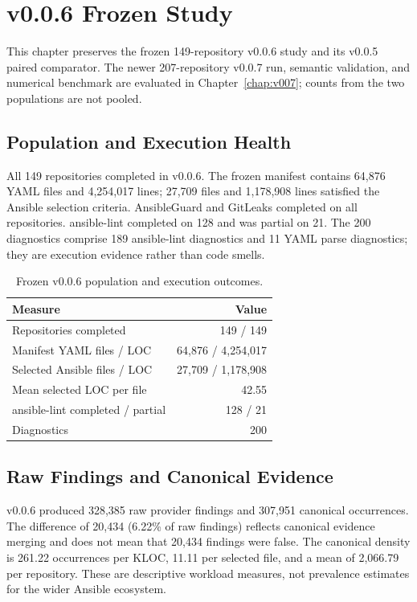\chapter{v0.0.6 Frozen Study}
\label{chap:results}

This chapter preserves the frozen 149-repository v0.0.6 study and its
v0.0.5 paired comparator. The newer 207-repository v0.0.7 run, semantic
validation, and numerical benchmark are evaluated in
Chapter~\ref{chap:v007}; counts from the two populations are not pooled.

\section{Population and Execution Health}
All 149 repositories completed in v0.0.6. The frozen manifest contains 64,876
YAML files and 4,254,017 lines; 27,709 files and 1,178,908 lines satisfied the
Ansible selection criteria. AnsibleGuard and GitLeaks completed on all
repositories. ansible-lint completed on 128 and was partial on 21. The 200
diagnostics comprise 189 ansible-lint diagnostics and 11 YAML parse
diagnostics; they are execution evidence rather than code smells.

\begin{table}[H]
\centering
\caption{Frozen v0.0.6 population and execution outcomes.}
\begin{tabular}{lr}
\toprule
Measure & Value \\
\midrule
Repositories completed & 149 / 149 \\
Manifest YAML files / LOC & 64,876 / 4,254,017 \\
Selected Ansible files / LOC & 27,709 / 1,178,908 \\
Mean selected LOC per file & 42.55 \\
ansible-lint completed / partial & 128 / 21 \\
Diagnostics & 200 \\
\bottomrule
\end{tabular}
\end{table}

\section{Raw Findings and Canonical Evidence}
v0.0.6 produced 328,385 raw provider findings and 307,951 canonical
occurrences. The difference of 20,434 (6.22\% of raw findings) reflects
canonical evidence merging and does not mean that 20,434 findings were false.
The canonical density is 261.22 occurrences per KLOC, 11.11 per selected file,
and a mean of 2,066.79 per repository. These are descriptive workload measures,
not prevalence estimates for the wider Ansible ecosystem.

